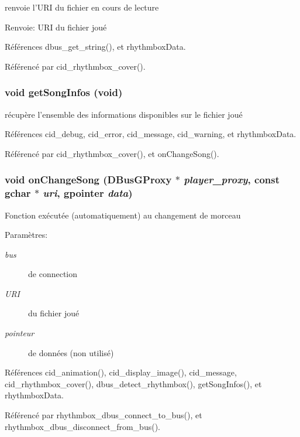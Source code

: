 renvoie l'URI du fichier en cours de lecture \begin{Desc}
\item[Renvoie:]URI du fichier joué \end{Desc}


Références dbus\_\-get\_\-string(), et rhythmboxData.

Référencé par cid\_\-rhythmbox\_\-cover().
\subsubsection{\setlength{\rightskip}{0pt plus 5cm}void getSongInfos (void)}\label{cid-rhythmbox_8c_ce85b541409fc3d7ba26a2ab47617b16}


récupère l'ensemble des informations disponibles sur le fichier joué 

Références cid\_\-debug, cid\_\-error, cid\_\-message, cid\_\-warning, et rhythmboxData.

Référencé par cid\_\-rhythmbox\_\-cover(), et onChangeSong().
\subsubsection{\setlength{\rightskip}{0pt plus 5cm}void onChangeSong (DBusGProxy $\ast$ {\em player\_\-proxy}, \/  const gchar $\ast$ {\em uri}, \/  gpointer {\em data})}\label{cid-rhythmbox_8c_1d6e9f9b5bc40a54129f0e103ff4504a}


Fonction exécutée (automatiquement) au changement de morceau \begin{Desc}
\item[Paramètres:]
\begin{description}
\item[{\em bus}]de connection \item[{\em URI}]du fichier joué \item[{\em pointeur}]de données (non utilisé) \end{description}
\end{Desc}


Références cid\_\-animation(), cid\_\-display\_\-image(), cid\_\-message, cid\_\-rhythmbox\_\-cover(), dbus\_\-detect\_\-rhythmbox(), getSongInfos(), et rhythmboxData.

Référencé par rhythmbox\_\-dbus\_\-connect\_\-to\_\-bus(), et rhythmbox\_\-dbus\_\-disconnect\_\-from\_\-bus().
